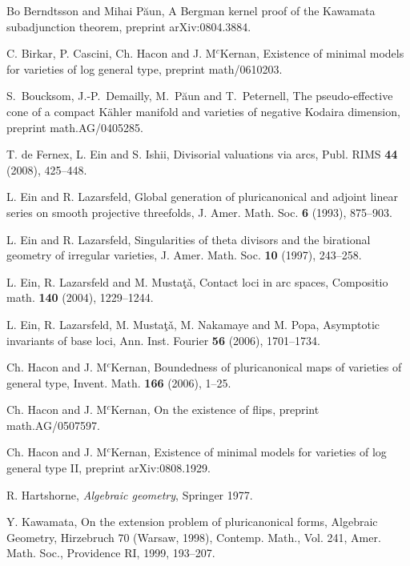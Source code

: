 \documentclass[11pt]{amsart}
\theoremstyle{plain}
\theoremstyle{definition}
\begin{document}
\begin{thebibliography}{La}

Bo Berndtsson and Mihai P\u aun, {A Bergman kernel proof of the Kawamata subadjunction theorem}, 
preprint arXiv:0804.3884.

C. Birkar, P. Cascini, Ch. Hacon and J. M$^c$Kernan, {Existence of minimal models for varieties of log general type}, preprint math/0610203.

S.~Boucksom, J.-P.~Demailly, M.~P\u aun and T.~Peternell, The pseudo-effective 
cone of a compact K\" ahler manifold and varieties of negative Kodaira dimension, 
preprint math.AG/0405285.

T. de Fernex, L. Ein and S. Ishii, {Divisorial valuations via arcs}, Publ. RIMS \textbf{44} (2008), 425--448.

L. Ein and R. Lazarsfeld, {Global generation of pluricanonical and adjoint linear series on smooth projective threefolds}, J. Amer. Math. Soc.
\textbf{6} (1993), 875--903.

L. Ein and R. Lazarsfeld, {Singularities of theta divisors and the
birational geometry of irregular varieties}, J. Amer. Math. Soc.
\textbf{10} (1997), 243--258.

L. Ein, R. Lazarsfeld and M. Musta\c{t}\v{a}, {Contact loci in arc spaces}, Compositio math. \textbf{140} (2004), 1229--1244.

L. Ein, R. Lazarsfeld, M. Musta\c{t}\v{a}, M. Nakamaye and M. Popa, {Asymptotic invariants of base loci},  Ann. Inst. Fourier \textbf{56} (2006), 1701--1734.

Ch. Hacon and J. M$^c$Kernan, {Boundedness
of pluricanonical maps of varieties of general type}, Invent. Math. \textbf{166} (2006), 1--25.

Ch. Hacon and J. M$^c$Kernan, {On the existence of flips}, preprint math.AG/0507597.

Ch. Hacon and J. M$^c$Kernan, {Existence of minimal models for varieties of log general type II}, preprint arXiv:0808.1929.

R. Hartshorne, \emph{Algebraic geometry}, Springer 1977.

Y. Kawamata, {On the extension problem of pluricanonical forms}, Algebraic Geometry, 
Hirzebruch 70 (Warsaw, 1998), Contemp. Math., Vol. 241, Amer. Math. Soc., Providence
RI, 1999, 193--207.


\end{thebibliography}
\end{document}
